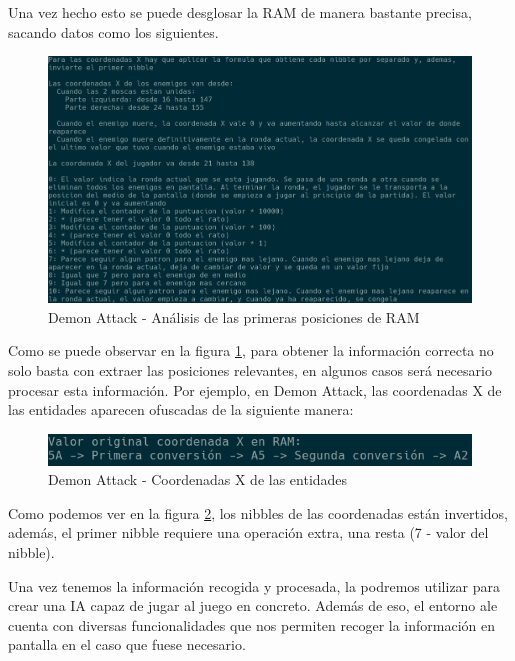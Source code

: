 Una vez hecho esto se puede desglosar la RAM de manera bastante precisa, sacando datos como los siguientes.

\begin{figure}[h]
	\centering
	\includegraphics[width=1\textwidth]{Figures/AnalisisRAM}
	\caption{Demon Attack - Análisis de las primeras posiciones de RAM}
	\label{fig:AnalisisRAM}
\end{figure}

Como se puede observar en la figura \ref{fig:AnalisisRAM}, para obtener la información correcta no solo basta con extraer las posiciones relevantes, en algunos casos será necesario procesar esta información. Por ejemplo, en Demon Attack, las coordenadas X de las entidades aparecen ofuscadas de la siguiente manera:

\begin{figure}[h]
	\centering
	\includegraphics[width=1\textwidth]{Figures/DAttackOpsRequired}
	\caption{Demon Attack - Coordenadas X de las entidades}
	\label{fig:DAttackOpsRequired}
\end{figure}

Como podemos ver en la figura \ref{fig:DAttackOpsRequired}, los nibbles de las coordenadas están invertidos, además, el primer nibble requiere una operación extra, una resta (7 - valor del nibble). 

Una vez tenemos la información recogida y procesada, la podremos utilizar para crear una IA capaz de jugar al juego en concreto. Además de eso, el entorno \ac{ale} cuenta con diversas funcionalidades que nos permiten recoger la información en pantalla en el caso que fuese necesario. 

